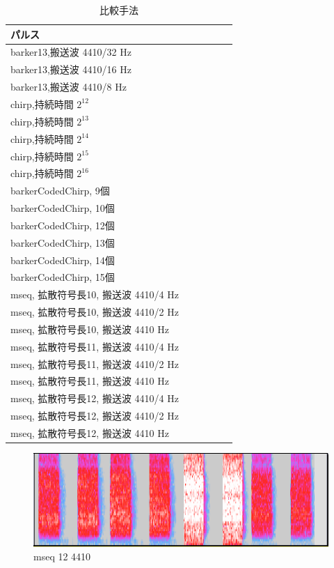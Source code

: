 \begin{table}[p]\centering
  \caption{比較手法}
  \label{tab:hikaku}
  \begin{tabular}{l|rrrrr}
    \hline
    パルス \\
    \hline
    barker13,搬送波 4410/32 Hz   \\
    barker13,搬送波 4410/16 Hz  \\
    barker13,搬送波 4410/8 Hz  \\
    chirp,持続時間 $2^{12}$  \\
    chirp,持続時間 $2^{13}$  \\
    chirp,持続時間 $2^{14}$  \\
    chirp,持続時間 $2^{15}$  \\
    chirp,持続時間 $2^{16}$  \\
    barkerCodedChirp, 9個  \\
    barkerCodedChirp, 10個  \\
    barkerCodedChirp, 12個  \\
    barkerCodedChirp, 13個  \\
    barkerCodedChirp, 14個  \\
    barkerCodedChirp, 15個  \\
    mseq, 拡散符号長10, 搬送波 4410/4 Hz  \\
    mseq, 拡散符号長10, 搬送波 4410/2 Hz  \\
    mseq, 拡散符号長10, 搬送波 4410 Hz  \\
    mseq, 拡散符号長11, 搬送波 4410/4 Hz  \\
    mseq, 拡散符号長11, 搬送波 4410/2 Hz  \\
    mseq, 拡散符号長11, 搬送波 4410 Hz  \\
    mseq, 拡散符号長12, 搬送波 4410/4 Hz  \\
    mseq, 拡散符号長12, 搬送波 4410/2 Hz  \\
    mseq, 拡散符号長12, 搬送波 4410 Hz  \\
    \hline
  \end{tabular}
\end{table}


\begin{figure}[p]
  \centering
  \includegraphics[clip,width=1.05\hsize]{img/mseq_12_4410.png}
  \caption{mseq 12 4410}\label{fig:mseqZ12Z4410}
\end{figure}


